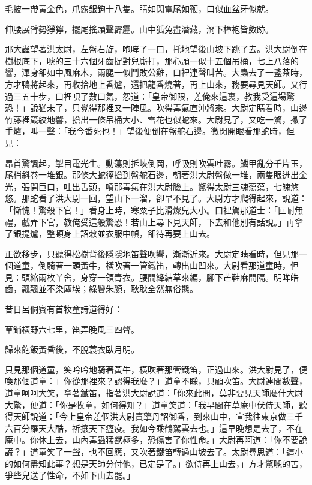 \documentclass[11pt,a4paper]{article}
\begin{document}
毛披一帶黃金色，爪露銀鉤十八隻。睛如閃電尾如鞭，口似血盆牙似就。

伸腰展臂勢猙獰，擺尾搖頭聲霹靂。山中狐兔盡潛藏，澗下樟袍皆斂跡。

那大蟲望著洪太尉，左盤右旋，咆哮了一口，托地望後山坡下跳了去。洪大尉倒在樹根底下，唬的三十六個牙齒捉對兒廝打，那心頭一似十五個吊桶，七上八落的響，渾身卻如中風麻木，兩腿一似鬥敗公雞，口裡連聲叫苦。大蟲去了一盞茶時，方才鴨將起來，再收拾地上香爐，還把龍香燒著，再上山來，務要尋見天師。又行過三五十步，口裡唄了數口氣，怨道：「皇帝御限，差俺來這裏，教我受這場驚恐！」說猶未了，只覺得那裡又一陣風。吹得毒氣直沖將來。大尉定睛看時，山邊竹藤裡箴絞地響，搶出一條吊桶大小、雪花也似蛇來。大尉見了，又吃一驚，撇了手爐，叫一聲：「我今番死也！」望後便倒在盤舵石邊。微閃開眼看那蛇時，但見：

昂首驚諷起，掣目電光生。動蕩則拆峽倒岡，呼吸則吹雲吐霧。鱗甲亂分千片玉，尾梢斜卷一堆銀。那條大蛇徑搶到盤舵石邊，朝著洪大尉盤做一堆，兩隻眼迸出金光，張開巨口，吐出舌頭，噴那毒氣在洪大尉臉上。驚得太尉三魂蕩蕩，七魄悠悠。那蛇看了洪大尉一回，望山下一溜，卻早不見了。大尉方才爬得起來，說道：「慚愧！驚殺下官！」看身上時，寒粟子比滑燦兒大小。口裡駕那道士：「叵耐無禮，戲弄下官，教俺受這般驚恐！若山上尋下見天師，下去和他別有話說。」再拿了銀提爐，整頓身上詔敕並衣服中幀，卻待再要上山去。

正欲移步，只聽得松樹背後隱隱地笛聲吹響，漸漸近來。大尉定睛看時，但見那一個道童，倒騎著一頭黃牛，橫吹著一管鐵笛，轉出山凹來。大尉看那道童時，但見：頭縮兩枚丫舍，身穿一領青衣。腰間絳結草來編，腳下芒鞋麻間隔。明眸皓齒，飄飄並不染塵埃；綠鬢朱顏，耿耿全然無俗態。

昔日呂侗賓有首牧童詩道得好：

草鋪橫野六七里，笛弄晚風三四聲。

歸來飽飯黃昏後，不脫蓑衣臥月明。

只見那個道童，笑吟吟地騎著黃牛，橫吹著那管鐵笛，正過山來。洪大尉見了，便喚那個道童：」你從那裡來？認得我麼？」道童不睬，只顧吹笛。大尉連間數聲，道童呵呵大笑，拿著鐵笛，指著洪大尉說道：「你來此問，莫非要見天師麼什大尉大驚，便道：「你是牧童，如何得知？」道童笑道：「我早間在草庵中伏侍天師，聽得天師說道：「今上皇帝差個洪大尉責擎丹詔御香，到來山中，宣我往東京做三千六百分羅天大酷，祈攘天下瘟疫。我如今乘鶴駕雲去也。」這早晚想是去了，不在庵中。你休上去，山內毒蟲猛獸極多，恐傷害了你性命。」大尉再阿道：「你不要說謊？」道童笑了一聲，也不回應，又吹著鐵笛轉過山坡去了。太尉尋思道：「這小的如何盡知此事？想是天師分付他，已定是了。」欲侍再上山去，」方才驚唬的苦，爭些兒送了性命，不如下山去罷。」
\end{document}
